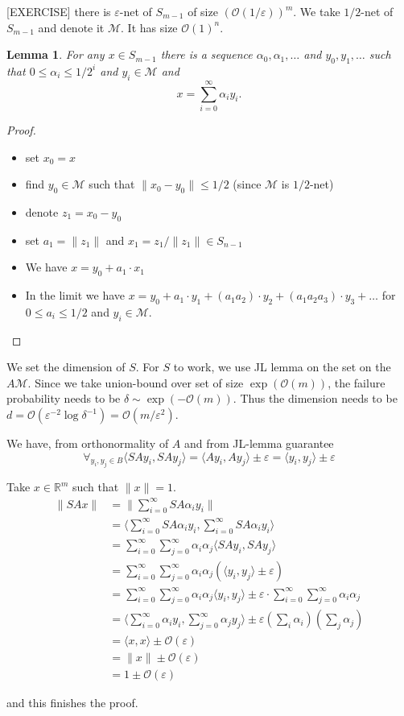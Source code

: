 \documentclass[11pt]{article}
\newtheorem{lemma}[theorem]{Lemma}
\newcommand{\bigo}{\mathcal{O}}
\begin{document}
[EXERCISE] there is $\varepsilon$-net of $S_{m-1}$ of size $(\bigo(1/\varepsilon))^m$. We take $1/2$-net of $S_{m-1}$ and denote it $\mathcal{M}$. It has size $\bigo(1)^n$.

\begin{lemma}
For any $x \in S_{m-1}$ there is a sequence $\alpha_0,\alpha_1,\ldots$ and $y_0,y_1,\ldots$ such that $0 \le \alpha_i \le 1/2^i$ and $y_i \in \mathcal{M}$ and 
$$x = \sum_{i=0}^{\infty} \alpha_i y_i.$$
\end{lemma}
\begin{proof}
\ 
\begin{itemize}
\item set $x_0 = x$ 
\item find $y_0 \in \mathcal{M}$ such that $\| x_0- y_0 \| \le 1/2$ (since $\mathcal{M}$ is $1/2$-net)
\item denote $z_1 = x_0 - y_0$
\item set $a_1 = \|z_1\|$ and $x_1 = z_1/\|z_1\| \in S_{n-1}$
\item We have $x =  y_0 + a_1 \cdot x_1$ 
\item In the limit we have $x = y_0 + a_1 \cdot y_1 + (a_1 a_2) \cdot y_2 + (a_1 a_2 a_3) \cdot y_3 + \ldots$
for $0 \le a_i \le 1/2$ and $y_i \in \mathcal{M}$.
\end{itemize}
\end{proof}

We set the dimension of $S$. For $S$ to work, we use JL lemma on the set on the $A \mathcal{M}$. Since we take union-bound over set of size $\exp(\bigo(m))$, the failure probability needs to be $\delta \sim \exp(-\bigo(m))$. Thus the dimension needs to be $d = \bigo(\varepsilon^{-2} \log \delta^{-1}) = \bigo(m/\varepsilon^2)$.

We have, from orthonormality of $A$ and from JL-lemma guarantee
$$\forall_{y_i,y_j \in B} \langle SAy_i, SAy_j \rangle = \langle Ay_i, Ay_j \rangle  \pm \varepsilon = \langle y_i, y_j \rangle \pm \varepsilon$$

Take $x \in \mathbb{R}^m$ such that $\|x\| = 1$.
\begin{align*}
\|SAx\| &= \| \sum_{i=0}^{\infty} SA \alpha_i y_i \|\\
&= \langle \sum_{i=0}^{\infty} SA \alpha_i y_i , \sum_{i=0}^{\infty} SA \alpha_i y_i  \rangle\\
&= \sum_{i=0}^{\infty} \sum_{j=0}^{\infty} \alpha_i \alpha_j \langle SAy_i, SAy_j \rangle\\
&= \sum_{i=0}^{\infty} \sum_{j=0}^{\infty} \alpha_i \alpha_j ( \langle y_i, y_j \rangle \pm \varepsilon)\\
&= \sum_{i=0}^{\infty} \sum_{j=0}^{\infty} \alpha_i \alpha_j \langle y_i, y_j \rangle \pm \varepsilon \cdot \sum_{i=0}^{\infty} \sum_{j=0}^{\infty} \alpha_i \alpha_j\\
&= \langle \sum_{i=0}^{\infty} \alpha_i y_i, \sum_{j=0}^{\infty} \alpha_j y_j \rangle \pm \varepsilon \left( \sum_i \alpha_i \right) \left( \sum_j \alpha_j \right)\\
&= \langle x, x\rangle \pm \bigo(\varepsilon)\\
&= \|x\| \pm \bigo(\varepsilon)\\
&= 1 \pm \bigo(\varepsilon)
\end{align*}

and this finishes the proof.



\end{document}
